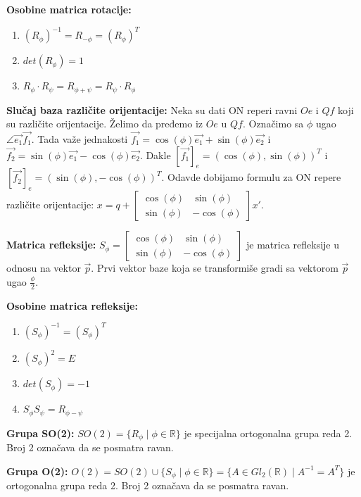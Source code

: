 \documentclass[12pt]{article}
\newcommand{\vek}[1]{\overrightarrow{#1}}
\begin{document}
\textbf{Osobine matrica rotacije:}
\begin{enumerate}[label=\textbf{(\arabic*)}]
    \item $(R_\phi)^{-1}=R_{-\phi}=(R_\phi)^T$
    \item $det(R_\phi)=1$
    \item $R_\phi\cdot R_\psi=R_{\phi+\psi}=R_\psi\cdot R_\phi$
\end{enumerate}
\par

\textbf{Slučaj baza različite orijentacije:} Neka su dati ON reperi ravni $Oe$ i
$Qf$ koji su različite orijentacije. Želimo da pređemo iz $Oe$ u $Qf$. Označimo
sa $\phi$ ugao $\angle{\vek{e_1}\vek{f_1}}$. Tada važe jednakosti
$\vek{f_1}=\cos(\phi)\vek{e_1}+\sin(\phi)\vek{e_2}$ i
$\vek{f_2}=\sin(\phi)\vek{e_1}-\cos(\phi)\vek{e_2}$. Dakle
$[\vek{f_1}]_e=(\cos(\phi),\sin(\phi))^T$ i $[\vek{f_2}]_e=(\sin(\phi),-\cos(\phi))^T$.
Odavde dobijamo formulu za ON repere različite orijentacije: $x=q+\begin{bmatrix}
        \cos(\phi) & \sin(\phi)  \\
        \sin(\phi) & -\cos(\phi)
    \end{bmatrix} x'$.
\par

\textbf{Matrica refleksije:} $S_\phi=\begin{bmatrix}
        \cos(\phi) & \sin(\phi)  \\
        \sin(\phi) & -\cos(\phi)
    \end{bmatrix}$ je matrica refleksije u odnosu na vektor $\vek{p}$.
Prvi vektor baze koja se transformiše gradi sa vektorom $\vek{p}$ ugao
$\frac{\phi}{2}$.
\par

\textbf{Osobine matrica refleksije:}
\begin{enumerate}[label=\textbf{(\arabic*)}]
    \item $(S_\phi)^{-1}=(S_\phi)^T$
    \item $(S_\phi)^{2}=E$
    \item $det(S_\phi)=-1$
    \item $S_\phi S_\psi=R_{\phi-\psi}$
\end{enumerate}
\par

\textbf{Grupa SO(2):} $SO(2)=\{R_\phi\mid\phi\in\mathbb{R}\}$ je specijalna
ortogonalna grupa reda 2. Broj 2 označava da se posmatra ravan.
\par

\textbf{Grupa O(2):}
$O(2)=SO(2)\cup\{S_\phi\mid\phi\in\mathbb{R}\}=\{A\in Gl_2(\mathbb{R})\mid A^{-1}=A^T\}$
je ortogonalna grupa reda 2. Broj 2 označava da se posmatra ravan.
\end{document}

